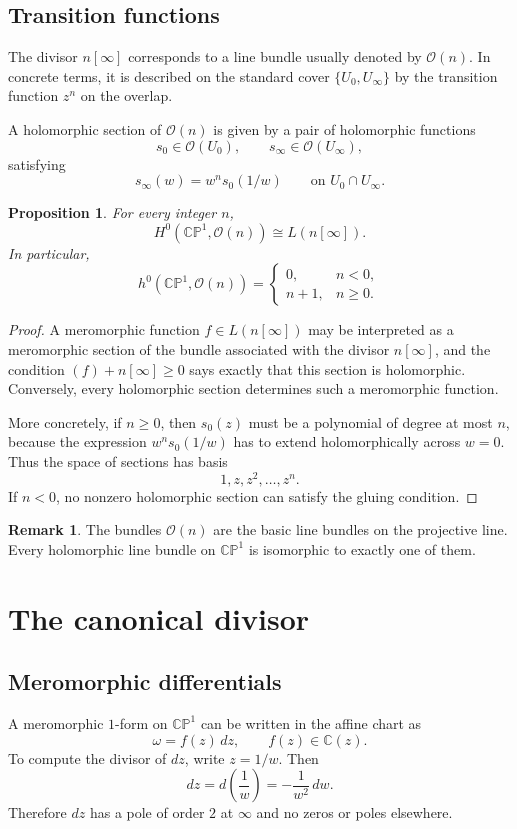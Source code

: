 \documentclass[11pt]{article}
\newcommand{\C}{\mathbb{C}}
\newcommand{\CP}{\mathbb{CP}}
\newcommand{\OO}{\mathcal{O}}
\newcommand{\CPone}{\CP^1}
\theoremstyle{plain}
\newtheorem{proposition}[theorem]{Proposition}
\theoremstyle{definition}
\newtheorem{remark}[theorem]{Remark}
\begin{document}
\subsection{Transition functions}
The divisor $n[\infty]$ corresponds to a line bundle usually denoted by $\OO(n)$. In concrete terms, it is described on the standard cover $\{U_0,U_{\infty}\}$ by the transition function $z^n$ on the overlap.

A holomorphic section of $\OO(n)$ is given by a pair of holomorphic functions
\[
s_0\in \OO(U_0),\qquad s_{\infty}\in \OO(U_{\infty}),
\]
satisfying
\[
s_{\infty}(w)=w^n s_0(1/w)
\qquad\text{on }U_0\cap U_{\infty}.
\]

\begin{proposition}
For every integer $n$,
\[
H^0(\CPone,\OO(n))\cong L(n[\infty]).
\]
In particular,
\[
h^0(\CPone,\OO(n))=
\begin{cases}
0,& n<0,\\
n+1,& n\ge 0.
\end{cases}
\]
\end{proposition}

\begin{proof}
A meromorphic function $f\in L(n[\infty])$ may be interpreted as a meromorphic section of the bundle associated with the divisor $n[\infty]$, and the condition $(f)+n[\infty]\ge 0$ says exactly that this section is holomorphic. Conversely, every holomorphic section determines such a meromorphic function.

More concretely, if $n\ge 0$, then $s_0(z)$ must be a polynomial of degree at most $n$, because the expression $w^n s_0(1/w)$ has to extend holomorphically across $w=0$. Thus the space of sections has basis
\[
1,z,z^2,\dots,z^n.
\]
If $n<0$, no nonzero holomorphic section can satisfy the gluing condition.
\end{proof}

\begin{remark}
The bundles $\OO(n)$ are the basic line bundles on the projective line. Every holomorphic line bundle on $\CPone$ is isomorphic to exactly one of them.
\end{remark}

\section{The canonical divisor}
\subsection{Meromorphic differentials}
A meromorphic $1$-form on $\CPone$ can be written in the affine chart as
\[
\omega=f(z)\,dz,
\qquad f(z)\in \C(z).
\]
To compute the divisor of $dz$, write $z=1/w$. Then
\[
dz=d\left(\frac{1}{w}\right)=-\frac{1}{w^2}\,dw.
\]
Therefore $dz$ has a pole of order $2$ at $\infty$ and no zeros or poles elsewhere.
\end{document}
